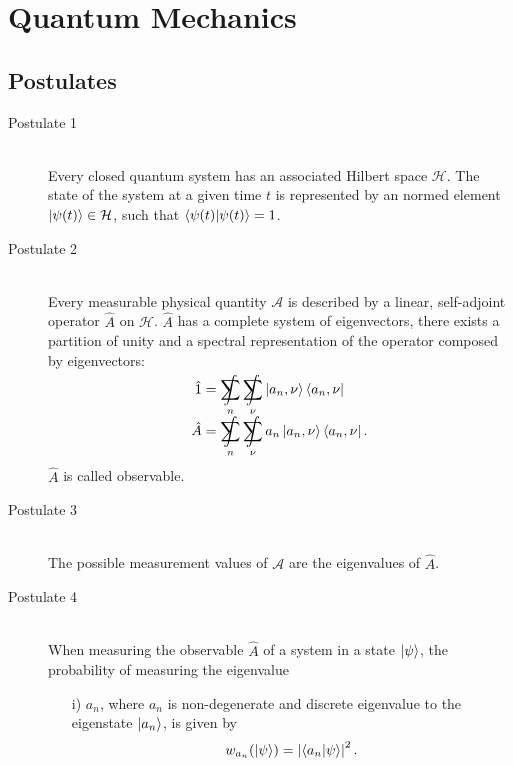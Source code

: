 \section{Quantum Mechanics}
	\subsection{Postulates}
		\begin{description}
			\item[Postulate 1]\hfill \\
				Every closed quantum system has an associated Hilbert space $\mathcal{H}$. The state of the system at a given time $t$ is represented by an normed element $\Ket{\psi(t)} \in \mathcal{H}$, such that $\braket{\psi(t)|\psi(t)} = 1$.
			\item[Postulate 2]\hfill \\
				Every measurable physical quantity $\mathcal{A}$ is described by a linear, self-adjoint operator $\hat{A}$ on $\mathcal{H}$.
				$\hat{A}$ has a complete system of eigenvectors, \ie there exists a partition of unity and a spectral representation of the operator composed by eigenvectors:
				\begin{equation}
					\begin{aligned}
						\hat{1} &= \SumInt_n \SumInt_\nu \Ket{a_n,\nu}\Bra{a_n,\nu} \\
						\hat{A} &= \SumInt_n \SumInt_\nu a_n\Ket{a_n,\nu}\Bra{a_n,\nu}. \\
					\end{aligned}
				\end{equation}
				$\hat{A}$ is called observable.
			\item[Postulate 3]\hfill \\
				The possible measurement values of $\mathcal{A}$ are the eigenvalues of $\hat{A}$.
			\item[Postulate 4]\hfill \\
				When measuring the observable $\hat{A}$ of a system in a state $\Ket{\psi}$, the probability of measuring the eigenvalue
				\begin{itemize}
					\item[i)] $a_n$, where $a_n$ is non-degenerate and discrete eigenvalue to the eigenstate $\Ket{a_n}$, is given by
					\begin{equation}
						w_{a_n}(\Ket{\psi}) = \left| \braket{a_n|\psi} \right|^2.
					\end{equation}

\end{itemize}
\end{description}
